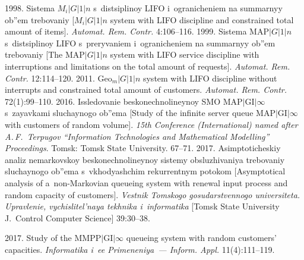 \begin{multicols}{2}
{{\begin{thebibliography}{99}
 1998. Sistema $M_i|G|1|n$ s~distsiplinoy LIFO 
i~ogranicheniem na summarnyy ob''em trebovaniy [$M_i|G|1|n$ 
system with LIFO discipline and constrained total amount of items]. 
\textit{Automat. Rem. Contr.} 4:106--116.
 1999. Sistema $\mathrm{MAP}|G|1|n$ 
s~dis\-tsip\-li\-noy LIFO s~preryvaniem i~ogranicheniem na summarnyy ob''em trebovaniy 
[The $\mathrm{MAP}|G|1|n$ system with LIFO service discipline with 
interruptions and limitations on the total amount of requests]. 
\textit{Automat. Rem. Contr.} 12:114--120.
2011. $\mathrm{Geo}_m|G|1|n$ 
system with LIFO discipline without interrupts and constrained total amount of 
customers. \textit{Automat. Rem. Contr.} 72(1):99--110.
2016. Issledovanie beskonechnolineynoy SMO $\mathrm{MAP}|\mathrm{GI}|\infty$ 
s~zayavkami sluchaynogo ob''ema [Study of the infinite server queue 
$\mathrm{MAP}|\mathrm{GI}|\infty$ with customers of random volume]. 
\textit{15th Conference (International)
named after A.\,F.~Terpugov ``Information Technologies and Mathematical Modelling'' 
Proceedings}. Tomsk: Tomsk State University.  67--71.
 2017. Asimptoticheskiy analiz 
nemarkovskoy beskonechnolineynoy sistemy obsluzhivaniya trebovaniy sluchaynogo 
ob''ema s~vkhodyashchim rekurrentnym potokom [Asymptotical analysis of 
a~non-Markovian queueing system with renewal input process and random capacity 
of customers]. \textit{Vestnik Tomskogo gosudarstvennogo universiteta. 
Upravlenie, vychislitel'naya tekhnika i~informatika} 
[Tomsk State University J.~Control Computer Science] 39:30--38.
{

}

2017. Study of the $\mathrm{MMPP}|\mathrm{GI}|\infty$ queueing system with random customers' capacities. 
\textit{Informatika i~ee Primeneniya~--- Inform. Appl.} 11(4):111--119.


\end{thebibliography}}}
\end{multicols}
